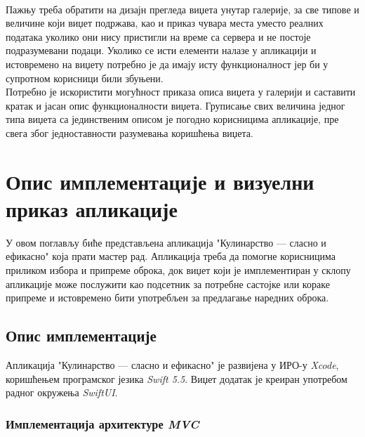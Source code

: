 \documentclass[12pt,oneside]{memoir}
\begin{document}
\\
\indent Пажњу треба обратити на дизајн прегледа виџета унутар галерије, за све типове и величине који виџет подржава, као и приказ чувара места уместо реалних података уколико они нису пристигли на време са сервера и не постоје подразумевани подаци. Уколико се исти елементи налазе у апликацији и истовремено на виџету потребно је да имају исту функционалност јер би у супротном корисници били збуњени. 
\\
\indent Потребно је искористити могућност приказа описа виџета у галерији и саставити кратак и јасан опис функционалности виџета. Груписање свих величина једног типа виџета са јединственим описом је погодно корисницима апликације, пре свега због једноставности разумевања коришћења виџета.

\chapter{Опис имплементације и визуелни приказ апликације}

\indent У овом поглављу биће представљена апликација "Кулинарство --- сласно и ефикасно" која прати мастер рад. Апликација треба да помогне корисницима приликом избора и припреме оброка, док виџет који је имплементиран у склопу апликације може послужити као подсетник за потребне састојке или кораке припреме и истовремено бити употребљен за предлагање наредних оброка.

\section{Опис имплементације}

\indent Апликација "Кулинарство --- сласно и ефикасно" је развијена у ИРО-у \textit{Xcode}, коришћењем програмског језика \textit{Swift 5.5}. Виџет додатак је креиран употребом радног окружења \textit{SwiftUI}.

\subsection{Имплементација архитектуре \textit{MVC}}
\end{document}
